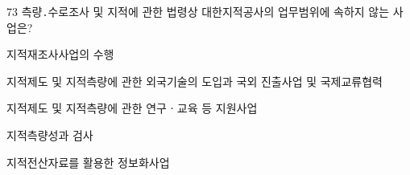 \begin{question}{73}
측량․수로조사 및 지적에 관한 법령상 대한지적공사의 업무범위에 속하지 않는 사업은?
\begin{choices}
  \item 지적재조사사업의 수행
  \item 지적제도 및 지적측량에 관한 외국기술의 도입과 국외 진출사업 및 국제교류협력
  \item 지적제도 및 지적측량에 관한 연구ㆍ교육 등 지원사업
  \item 지적측량성과 검사
  \item 지적전산자료를 활용한 정보화사업
\end{choices}
\end{question}
